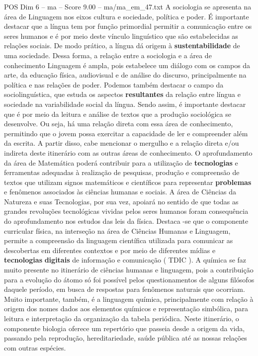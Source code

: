 \begin{textsample}{POS Dim 6 – ma – Score 9.00 – ma/ma\_em\_47.txt}
A sociologia se apresenta na área de Linguagem nos eixos cultura e sociedade, política e poder.
É importante destacar que a língua tem por função primordial permitir a comunicação entre os seres humanos e é por meio deste vínculo linguístico que são estabelecidas as relações sociais.
De modo prático, a língua dá origem à \textbf{sustentabilidade} de uma sociedade.
Dessa forma, a relação entre a sociologia e a área de conhecimento Linguagem é ampla, pois estabelece um diálogo com os campos da arte, da educação física, audiovisual e de análise do discurso, principalmente na política e nas relações de poder.
Podemos também destacar o campo da sociolinguística, que estuda os aspectos \textbf{resultantes} da relação entre língua e sociedade na variabilidade social da língua.
Sendo assim, é importante destacar que é por meio da leitura e análise de textos que a produção sociológica se desenvolve.
Ou seja, há uma relação direta com essa área de conhecimento, permitindo que o jovem possa exercitar a capacidade de ler e compreender além da escrita.
A partir disso, cabe mencionar o mergulho e a relação direta e/ou indireta deste itinerário com as outras áreas de conhecimento.
O aprofundamento da área de Matemática poderá contribuir para a utilização de \textbf{tecnologias} e ferramentas adequadas à realização de pesquisas, produção e compreensão de textos que utilizam signos matemáticos e científicos para representar \textbf{problemas} e fenômenos associados às ciências humanas e sociais.
A área de Ciências da Natureza e suas Tecnologias, por sua vez, apoiará no sentido de que todas as grandes revoluções tecnológicas vividas pelos seres humanos foram consequência do aprofundamento nos estudos das leis da física.
Destaca -se que o componente curricular física, na interseção na área de Ciências Humanas e Linguagem, permite a compreensão da linguagem científica utilizada para comunicar as descobertas em diferentes contextos e por meio de diferentes mídias e \textbf{tecnologias} \textbf{digitais} de informação e comunicação ( TDIC ).
A química se faz muito presente no itinerário de ciências humanas e linguagem, pois a contribuição para a evolução do átomo só foi possível pelos questionamentos de alguns filósofos daquele período, em busca de respostas para fenômenos naturais que ocorriam.
Muito importante, também, é a linguagem química, principalmente com relação à origem dos nomes dados aos elementos químicos e representação simbólica, para leitura e interpretação da organização da tabela periódica.
Neste itinerário, o componente biologia oferece um repertório que passeia desde a origem da vida, passando pela reprodução, hereditariedade, saúde pública até as nossas relações com outras espécies.

\end{textsample}

